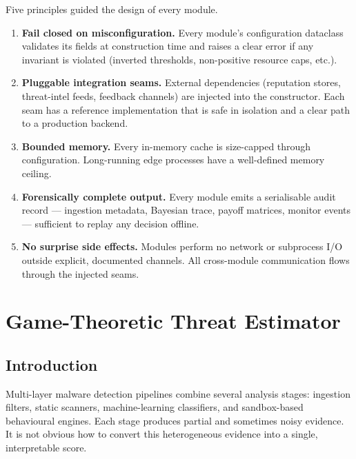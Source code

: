 \documentclass[12pt, a4paper]{report}
\begin{document}
Five principles guided the design of every module.

\begin{enumerate}
    \item \textbf{Fail closed on misconfiguration.} Every module's
          configuration dataclass validates its fields at construction
          time and raises a clear error if any invariant is violated
          (inverted thresholds, non-positive resource caps, etc.).
    \item \textbf{Pluggable integration seams.} External dependencies
          (reputation stores, threat-intel feeds, feedback channels) are
          injected into the constructor. Each seam has a reference
          implementation that is safe in isolation and a clear path to a
          production backend.
    \item \textbf{Bounded memory.} Every in-memory cache is size-capped
          through configuration. Long-running edge processes have a
          well-defined memory ceiling.
    \item \textbf{Forensically complete output.} Every module emits a
          serialisable audit record --- ingestion metadata, Bayesian
          trace, payoff matrices, monitor events --- sufficient to
          replay any decision offline.
    \item \textbf{No surprise side effects.} Modules perform no network
          or subprocess I/O outside explicit, documented channels. All
          cross-module communication flows through the injected seams.
\end{enumerate}

\cleardoublepage


\chapter{Game-Theoretic Threat Estimator}
\label{chap:gte}

\section{Introduction}

Multi-layer malware detection pipelines combine several analysis stages:
ingestion filters, static scanners, machine-learning classifiers, and
sandbox-based behavioural engines. Each stage produces partial and
sometimes noisy evidence. It is not obvious how to convert this
heterogeneous evidence into a single, interpretable score.
\end{document}

